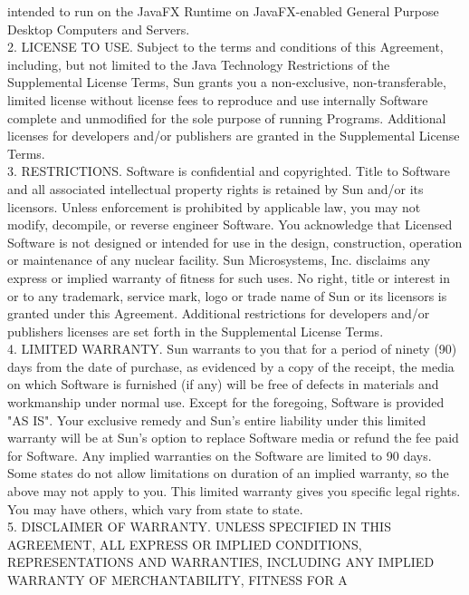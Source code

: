 {   intended to run on the JavaFX Runtime on JavaFX-enabled General
   Purpose Desktop Computers and Servers.
\\[4pt]
   2. LICENSE TO USE. Subject to the terms and conditions of this
   Agreement, including, but not limited to the Java Technology
   Restrictions of the Supplemental License Terms, Sun grants you a
   non-exclusive, non-transferable, limited license without license
   fees to reproduce and use internally Software complete and
   unmodified for the sole purpose of running Programs. Additional
   licenses for developers and/or publishers are granted in the
   Supplemental License Terms.
\\[4pt]
   3. RESTRICTIONS. Software is confidential and copyrighted. Title to
   Software and all associated intellectual property rights is
   retained by Sun and/or its licensors. Unless enforcement is
   prohibited by applicable law, you may not modify, decompile, or
   reverse engineer Software. You acknowledge that Licensed Software
   is not designed or intended for use in the design, construction,
   operation or maintenance of any nuclear facility. Sun Microsystems,
   Inc. disclaims any express or implied warranty of fitness for such
   uses. No right, title or interest in or to any trademark, service
   mark, logo or trade name of Sun or its licensors is granted under
   this Agreement. Additional restrictions for developers and/or
   publishers licenses are set forth in the Supplemental License
   Terms.
\\[4pt]
   4. LIMITED WARRANTY. Sun warrants to you that for a period of
   ninety (90) days from the date of purchase, as evidenced by a copy
   of the receipt, the media on which Software is furnished (if any)
   will be free of defects in materials and workmanship under normal
   use. Except for the foregoing, Software is provided "AS IS". Your
   exclusive remedy and Sun's entire liability under this limited
   warranty will be at Sun's option to replace Software media or
   refund the fee paid for Software. Any implied warranties on the
   Software are limited to 90 days. Some states do not allow
   limitations on duration of an implied warranty, so the above may
   not apply to you. This limited warranty gives you specific legal
   rights. You may have others, which vary from state to state.
\\[4pt]
   5. DISCLAIMER OF WARRANTY. UNLESS SPECIFIED IN THIS AGREEMENT, ALL
   EXPRESS OR IMPLIED CONDITIONS, REPRESENTATIONS AND WARRANTIES,
   INCLUDING ANY IMPLIED WARRANTY OF MERCHANTABILITY, FITNESS FOR A
}
